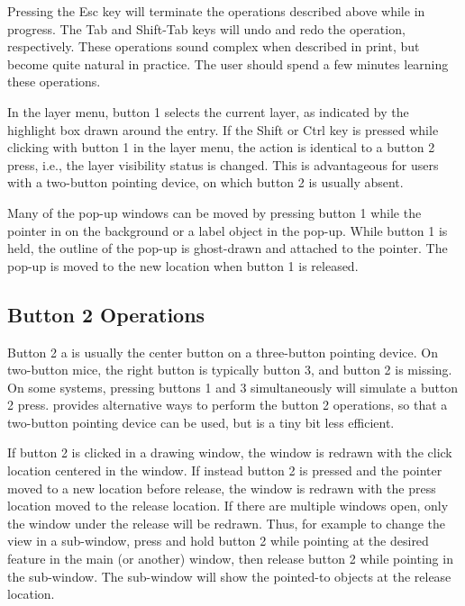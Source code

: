 Pressing the {\kb Esc} key will terminate the operations described
above while in progress.  The {\kb Tab} and {\kb Shift-Tab} keys will
undo and redo the operation, respectively.  These operations sound
complex when described in print, but become quite natural in practice. 
The user should spend a few minutes learning these operations.

In the layer menu, button 1 selects the current layer, as indicated
by the highlight box drawn around the entry.  If the {\kb Shift} or
{\kb Ctrl} key is pressed while clicking with button 1 in the layer
menu, the action is identical to a button 2 press, i.e., the layer
visibility status is changed.  This is advantageous for users with a
two-button pointing device, on which button 2 is usually absent.

Many of the pop-up windows can be moved by pressing button 1 while
the pointer in on the background or a label object in the pop-up.
While button 1 is held, the outline of the pop-up is ghost-drawn and
attached to the pointer.  The pop-up is moved to the new location when
button 1 is released.

\subsection{Button 2 Operations}
Button 2 a is usually the center button on a three-button pointing
device.  On two-button mice, the right button is typically button 3,
and button 2 is missing.  On some systems, pressing buttons 1 and 3
simultaneously will simulate a button 2 press.  {\Xic} provides
alternative ways to perform the button 2 operations, so that a
two-button pointing device can be used, but is a tiny bit less
efficient.

If button 2 is clicked in a drawing window, the window is redrawn with
the click location centered in the window.  If instead button 2 is
pressed and the pointer moved to a new location before release, the
window is redrawn with the press location moved to the release
location.  If there are multiple windows open, only the window under
the release will be redrawn.  Thus, for example to change the view in
a sub-window, press and hold button 2 while pointing at the desired
feature in the main (or another) window, then release button 2 while
pointing in the sub-window.  The sub-window will show the pointed-to
objects at the release location.

